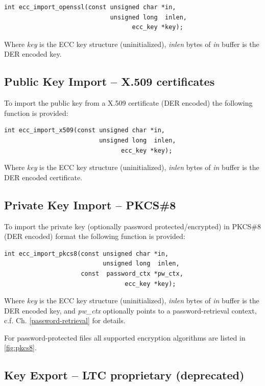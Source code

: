\documentclass[synpaper]{book}
\begin{document}
\begin{verbatim}
int ecc_import_openssl(const unsigned char *in,
                             unsigned long  inlen,
                                   ecc_key *key);
\end{verbatim}

Where \textit{key} is the ECC key structure (uninitialized), \textit{inlen} bytes of \textit{in} buffer is the DER encoded key.

\subsection{Public Key Import -- X.509 certificates}
To import the public key from a X.509 certificate (DER encoded) the following function is provided:

\begin{verbatim}
int ecc_import_x509(const unsigned char *in,
                          unsigned long  inlen,
                                ecc_key *key);
\end{verbatim}

Where \textit{key} is the ECC key structure (uninitialized), \textit{inlen} bytes of \textit{in} buffer is the DER encoded certificate.

\subsection{Private Key Import -- PKCS\#8}
To import the private key (optionally password protected/encrypted) in PKCS\#8 (DER encoded) format the following function is provided:

\begin{verbatim}
int ecc_import_pkcs8(const unsigned char *in,
                           unsigned long  inlen,
                     const  password_ctx *pw_ctx,
                                 ecc_key *key);
\end{verbatim}

Where \textit{key} is the ECC key structure (uninitialized), \textit{inlen} bytes of \textit{in} buffer is the DER encoded key,
and \textit{pw\_ctx} optionally points to a password-retrieval context, c.f. Ch. \ref{password-retrieval} for details.

For password-protected files all supported encryption algorithms are listed in \ref{fig:pkcs8}.

\subsection{Key Export -- LTC proprietary (deprecated)}
\end{document}
